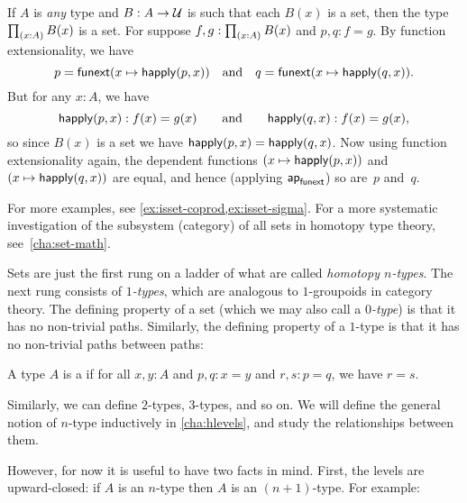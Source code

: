 \begin{eg}\label{thm:isset-forall}
  If $A$ is \emph{any} type and $B:A\to \mathcal{U}$ is such that each $B(x)$ is a set, then the type $\prd{x:A} B(x)$ is a set.
  For suppose $f,g:\prd{x:A} B(x)$ and $p,q:f=g$.
  By function extensionality, we have
  \begin{equation*}
    p = {\mathsf{funext} (x \mapsto \mathsf{happly}(p,x))}
    \quad\text{and}\quad
    q = {\mathsf{funext} (x \mapsto \mathsf{happly}(q,x))}.
  \end{equation*}
  But for any $x:A$, we have
  \begin{equation*}
   \mathsf{happly}(p,x):f(x)=g(x)
   \qquad\text{and}\qquad
   \mathsf{happly}(q,x):f(x)=g(x),
  \end{equation*}
  so since $B(x)$ is a set we have $\mathsf{happly}(p,x) = \mathsf{happly}(q,x)$.
  Now using function extensionality again, the dependent functions $(x \mapsto \mathsf{happly}(p,x))$ and $(x \mapsto \mathsf{happly}(q,x))$ are equal, and hence (applying $\mathsf{ap}_{\mathsf{funext}}$) so are~$p$ and~$q$.
\end{eg}

For more examples, see \autoref{ex:isset-coprod,ex:isset-sigma}.  For a more systematic investigation of the subsystem (category) of all sets in homotopy type theory, see~\autoref{cha:set-math}.

%

Sets are just the first rung on a ladder of what are called \emph{homotopy $n$-types}.
The next rung consists of \emph{$1$-types}, which are analogous to $1$-groupoids in category theory.
The defining property of a set (which we may also call a \emph{$0$-type}) is that it has no non-trivial paths.
Similarly, the defining property of a $1$-type is that it has no non-trivial paths between paths:

\begin{defn}\label{defn:1type}
  A type $A$ is a 
  if for all $x,y:A$ and $p,q:x=y$ and $r,s:p=q$, we have $r=s$.
\end{defn}

Similarly, we can define $2$-types, $3$-types, and so on.
We will define the general notion of $n$-type inductively in \autoref{cha:hlevels}, and study the relationships between them.

However, for now it is useful to have two facts in mind.
First, the levels are upward-closed: if $A$ is an $n$-type then $A$ is an $(n+1)$-type.
For example:

